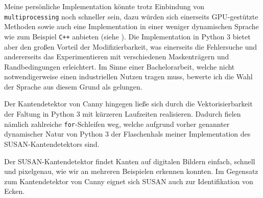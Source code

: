 \documentclass[a4paper, 11pt]{report}
\theoremstyle{definition}
\begin{document}
			Meine persönliche Implementation könnte trotz Einbindung von \texttt{multiprocessing} noch schneller sein, dazu würden sich einerseits GPU-gestützte Methoden sowie auch eine Implementation in einer weniger dynamischen Sprache wie zum Beispiel \texttt{C++} anbieten (siehe \cite{pyslow}). Die Implementation in Python 3 bietet aber den großen Vorteil der Modifizierbarkeit, was einerseits die Fehlersuche und andererseits das Experimentieren mit verschiedenen Maskenträgern und Randbedingungen erleichtert. Im Sinne einer Bachelorarbeit, welche nicht notwendigerweise einen industriellen Nutzen tragen muss, bewerte ich die Wahl der Sprache aus diesem Grund als gelungen.

			Der Kantendetektor von Canny hingegen ließe sich durch die Vektorisierbarkeit der Faltung in Python 3 mit kürzeren Laufzeiten realisieren. Dadurch fielen nämlich zahlreiche \texttt{for}-Schleifen weg, welche aufgrund vorher genannter dynamischer Natur von Python 3 der Flaschenhals meiner Implementation des SUSAN-Kantendetektors sind.

			Der SUSAN-Kantendetektor findet Kanten auf digitalen Bildern einfach, schnell und pixelgenau, wie wir an mehreren Beispielen erkennen konnten. Im Gegensatz zum Kantendetektor von Canny eignet sich SUSAN auch zur Identifikation von Ecken.


\pagebreak
\pagestyle{plain}
\end{document}
